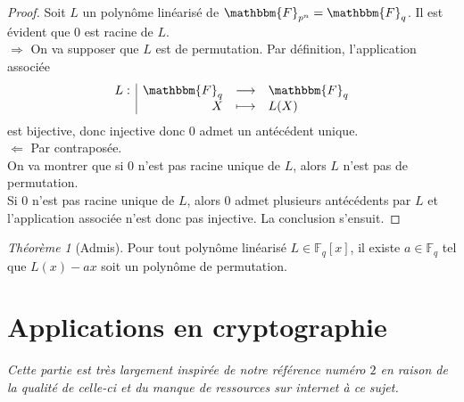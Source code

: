 \documentclass[12pt]{article}
\newcommand{\fonction}[5]{
\begin{displaymath}
\begin{array}{l|rcl}
\displaystyle
#1 : & #2 & \longrightarrow & #3 \\
    & #4 & \longmapsto & #5
\end{array}
\end{displaymath}
}
\theoremstyle{remark}\newtheorem{note}{Note}
\theoremstyle{remark}\newtheorem{nota}{Notation}
\newcommand{\Fq}{\mathbbm{F}_q}
\newtheorem{theorem}{Théorème}
\theoremstyle{definition}
\begin{document}
\begin{proof}
Soit $L$ un polynôme linéarisé de $\mathbbm{F}_{p^n} = \Fq$. Il est évident que $0$ est racine de $L$.\\
$\Rightarrow$ On va supposer que $L$ est de permutation. Par définition, l'application associée \fonction{L}{\Fq}{\Fq}{X}{L(X)} est bijective, donc injective donc $0$ admet un antécédent unique.\\

$\Leftarrow$ Par contraposée.\\
On va montrer que si $0$ n'est pas racine unique de $L$, alors $L$ n'est pas de permutation.\\
Si $0$ n'est pas racine unique de $L$, alors $0$ admet plusieurs antécédents par $L$ et l'application associée n'est donc pas injective. La conclusion s'ensuit.
\end{proof}

\begin{theorem}[Admis]
Pour tout polynôme linéarisé $L \in \mathbb{F}_q[x]$, il existe $a \in \mathbb{F}_q$ tel que $L(x) - ax$ soit un polynôme de permutation.
\end{theorem}



\pagebreak

\section{Applications en cryptographie}

\textsl{Cette partie est très largement inspirée de notre référence numéro $2$ en raison de la qualité de celle-ci et du manque de ressources sur internet à ce sujet.}
\end{document}
